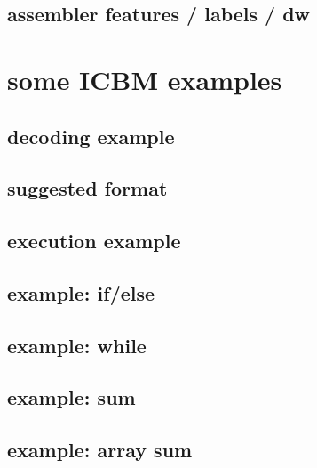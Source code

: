 

\subsection{assembler features / labels / dw}



%

\section{some ICBM examples}

\subsection{decoding example}


\subsection{suggested format}


\subsection{execution example}


\subsection{example: if/else}



\subsection{example: while}



\subsection{example: sum}



\subsection{example: array sum}



